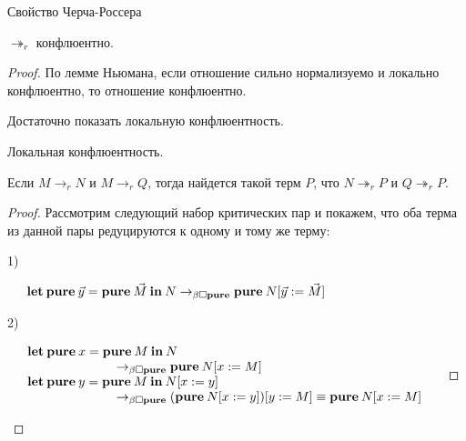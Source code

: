 \begin{theorem} Свойство Черча-Россера
$ $

$\twoheadrightarrow_{r}$ конфлюентно.
\end{theorem}

\begin{proof}

  По лемме Ньюмана, если отношение сильно нормализуемо и локально конфлюентно, то отношение конфлюентно.

Достаточно показать локальную конфлюентность.

\begin{lemma} Локальная конфлюентность.

Если $M \rightarrow_{r} N$ и $M \rightarrow_{r} Q$, тогда найдется такой терм $P$,
что $N \twoheadrightarrow_{r} P$ и $Q \twoheadrightarrow_{r} P$.

\end{lemma}

\begin{proof}

Рассмотрим следующий набор критических пар и покажем, что оба терма из данной пары редуцируются к одному и тому же терму:


1) 

$\begin{array}{lll}
&{\bf let \: pure \:} \vec{y} = {\bf pure \:} \vec{M} {\: \bf in \:} N \rightarrow_{\beta \Box {\bf pure}} {\bf pure \:} N [\vec{y} := \vec{M}]&
\end{array}$

\vspace{\baselineskip}

2) 

\vspace{\baselineskip}

$\begin{array}{lll}
&{\bf let \: pure \:} x = {\bf pure \:} M {\: \bf in \:} N& \\
&\quad\quad\quad\quad\quad\quad\quad \rightarrow_{\beta \Box {\bf pure}} {\bf pure \:} N [x := M]&\\
&{\bf let \: pure \:} y = {\bf pure \:} M {\: \bf in \:} N [x := y]&\\
&\quad\quad\quad\quad\quad\quad\quad \rightarrow_{\beta \Box {\bf pure}} ({\bf pure \:} N [x := y]) [y := M] \equiv {\bf pure \:} N [x := M]&
\end{array}$


\end{proof}
\end{proof}
